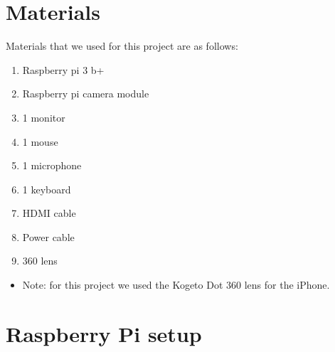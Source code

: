 \documentclass[onecolumn, draftclsnofoot,10pt, compsoc]{IEEEtran}
\begin{document}
\section{Materials}
Materials that we used for this project are as follows: \\
\begin{enumerate}
    \item Raspberry pi 3 b+
    \item Raspberry pi camera module
    \item 1 monitor
    \item 1 mouse
    \item 1 microphone
    \item 1 keyboard
    \item HDMI cable
    \item Power cable
    \item 360 lens
\end{enumerate}
\begin{itemize}
    \item Note: for this project we used the Kogeto Dot 360 lens for the iPhone.
\end{itemize}

\section{Raspberry Pi setup}
\end{document}
